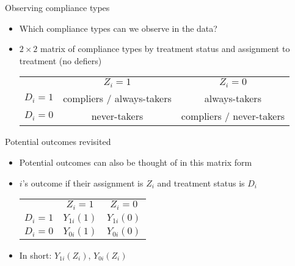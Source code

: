 \documentclass[aspectratio=169,compress,handout,t,xcolor=table]{beamer}
\begin{document}
\begin{frame}{Observing compliance types}
  \begin{itemize}
    \item Which compliance types can we observe in the data?
    \item \(2 \times 2\) matrix of compliance types by treatment status and assignment to treatment (no defiers)

    \vspace*{1em}
    \begin{table}
      \centering
      \begin{tabular}{c|c|c|}
        \multicolumn{1}{c}{} & \multicolumn{1}{c}{\(Z_{i}=1\)} & \multicolumn{1}{c}{\(Z_{i}=0\)} \\
        \cline{2-3}
        \(D_{i}=1\) & compliers / always-takers & always-takers \\
        \cline{2-3}
        \(D_{i}=0\) & never-takers  & compliers / never-takers  \\
        \cline{2-3}
      \end{tabular}
    \end{table}
  \end{itemize}
\end{frame}

\begin{frame}{Potential outcomes revisited}
  \begin{itemize}
    \item Potential outcomes can also be thought of in this matrix form
    \item \(i\)'s outcome if their assignment is \(Z_i\) and treatment status is \(D_i\)

    \vspace*{1em}
    \begin{table}
      \centering
      \begin{tabular}{c|c|c|}
        \multicolumn{1}{c}{} & \multicolumn{1}{c}{\(Z_{i}=1\)} & \multicolumn{1}{c}{\(Z_{i}=0\)} \\
        \cline{2-3}
        \(D_{i}=1\) & \(Y_{1i} (1)\) & \(Y_{1i} (0)\) \\
        \cline{2-3}
        \(D_{i}=0\) & \(Y_{0i} (1)\) & \(Y_{0i} (0)\)  \\
        \cline{2-3}
      \end{tabular}
    \end{table}

    \item In short: \(Y_{1i} (Z_i)\), \(Y_{0i} (Z_i)\)
  \end{itemize}
\end{frame}
\end{document}
